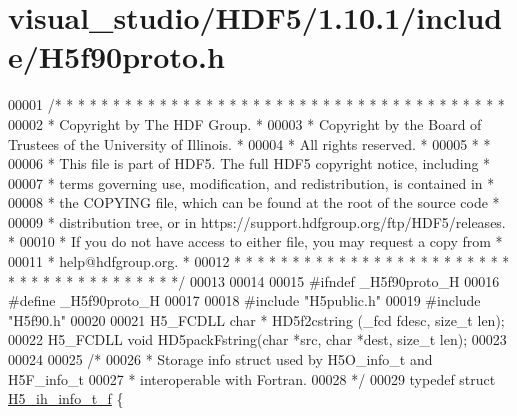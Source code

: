\hypertarget{visual__studio_2_h_d_f5_21_810_81_2include_2_h5f90proto_8h_source}{}\section{visual\+\_\+studio/\+H\+D\+F5/1.10.1/include/\+H5f90proto.h}
\label{visual__studio_2_h_d_f5_21_810_81_2include_2_h5f90proto_8h_source}

\begin{DoxyCode}
00001 \textcolor{comment}{/* * * * * * * * * * * * * * * * * * * * * * * * * * * * * * * * * * * * * * *}
00002 \textcolor{comment}{ * Copyright by The HDF Group.                                               *}
00003 \textcolor{comment}{ * Copyright by the Board of Trustees of the University of Illinois.         *}
00004 \textcolor{comment}{ * All rights reserved.                                                      *}
00005 \textcolor{comment}{ *                                                                           *}
00006 \textcolor{comment}{ * This file is part of HDF5.  The full HDF5 copyright notice, including     *}
00007 \textcolor{comment}{ * terms governing use, modification, and redistribution, is contained in    *}
00008 \textcolor{comment}{ * the COPYING file, which can be found at the root of the source code       *}
00009 \textcolor{comment}{ * distribution tree, or in https://support.hdfgroup.org/ftp/HDF5/releases.  *}
00010 \textcolor{comment}{ * If you do not have access to either file, you may request a copy from     *}
00011 \textcolor{comment}{ * help@hdfgroup.org.                                                        *}
00012 \textcolor{comment}{ * * * * * * * * * * * * * * * * * * * * * * * * * * * * * * * * * * * * * * */}
00013 
00014 
00015 \textcolor{preprocessor}{#ifndef \_H5f90proto\_H}
00016 \textcolor{preprocessor}{#define \_H5f90proto\_H}
00017 
00018 \textcolor{preprocessor}{#include "H5public.h"}
00019 \textcolor{preprocessor}{#include "H5f90.h"}
00020 
00021 H5\_FCDLL \textcolor{keywordtype}{char} * HD5f2cstring (\_fcd fdesc, \textcolor{keywordtype}{size\_t} len);
00022 H5\_FCDLL \textcolor{keywordtype}{void} HD5packFstring(\textcolor{keywordtype}{char} *src, \textcolor{keywordtype}{char} *dest, \textcolor{keywordtype}{size\_t} len);
00023 
00024 
00025 \textcolor{comment}{/*}
00026 \textcolor{comment}{ * Storage info struct used by H5O\_info\_t and H5F\_info\_t }
00027 \textcolor{comment}{ * interoperable with Fortran.}
00028 \textcolor{comment}{ */}
00029 \textcolor{keyword}{typedef} \textcolor{keyword}{struct }\hyperlink{struct_h5__ih__info__t__f}{H5\_ih\_info\_t\_f} \{

\end{DoxyCode}
